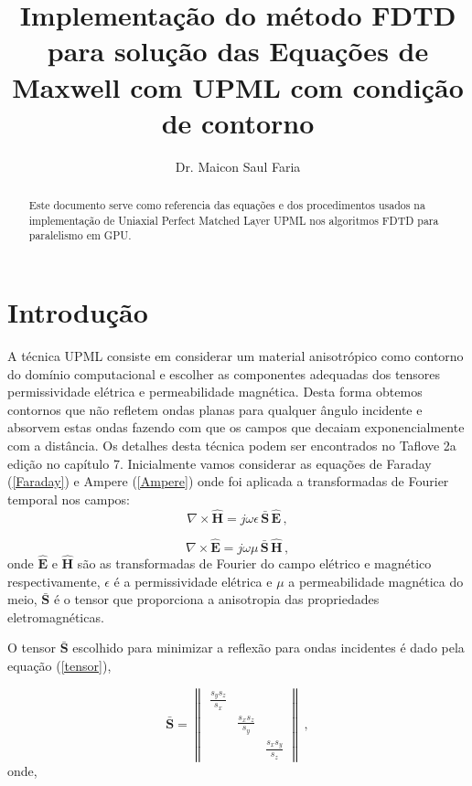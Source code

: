 \documentclass[a4paper,10pt]{article}
\title{Implementação do método FDTD para solução das Equações de Maxwell com UPML com condição de contorno}
\author{Dr. Maicon Saul Faria}
\begin{document}
\maketitle

\begin{abstract}
Este documento serve como referencia das equações e dos procedimentos usados na implementação de Uniaxial Perfect Matched Layer UPML nos algoritmos FDTD para paralelismo em GPU.
\end{abstract}

\section{Introdução}
A técnica UPML consiste em considerar um material anisotrópico como contorno do domínio computacional e escolher as componentes adequadas dos tensores permissividade elétrica  e permeabilidade magnética. Desta forma obtemos contornos que não refletem ondas planas para qualquer ângulo incidente e absorvem estas ondas fazendo com que os campos que decaiam exponencialmente com  a distância. Os detalhes desta técnica podem ser encontrados no Taflove 2a edição no capítulo 7.
Inicialmente vamos considerar as equações de Faraday (\ref{Faraday}) e Ampere (\ref{Ampere}) onde foi aplicada a transformadas de Fourier temporal nos campos:
\begin{equation}
 \nabla \times \mathbf{\hat{H}} = j \omega \epsilon \, \mathbf{\bar{S}}\, \mathbf{\hat{E}}\,, \label{Ampere}
\end{equation} 

\begin{equation}
\nabla \times \mathbf{\hat{E}} = j \omega \mu \, \mathbf{\bar{S}}\, \mathbf{\hat{H}}\,,\label{Faraday}
\end{equation} 
onde $\mathbf{\hat{E}}$ e $\mathbf{\hat{H}}$ são as transformadas de Fourier do campo elétrico e magnético respectivamente, $\epsilon$ é a permissividade elétrica e $\mu$ a permeabilidade magnética do meio, $\mathbf{\bar{S}}$ é o tensor que proporciona a anisotropia das propriedades eletromagnéticas.

O tensor $\mathbf{\bar{S}}$ escolhido para minimizar a reflexão para ondas incidentes é dado pela equação (\ref{tensor}),

\begin{equation}
  \mathbf{\bar{S}} = \begin{Vmatrix}
 \frac{s_y s_z}{s_x} &  &  \\
  & \frac{s_x s_z}{s_y} &  \\
  &  & \frac{s_x s_y}{s_z}
\end{Vmatrix}\,, \label{tensor}
\end{equation}
onde, 
\end{document}
